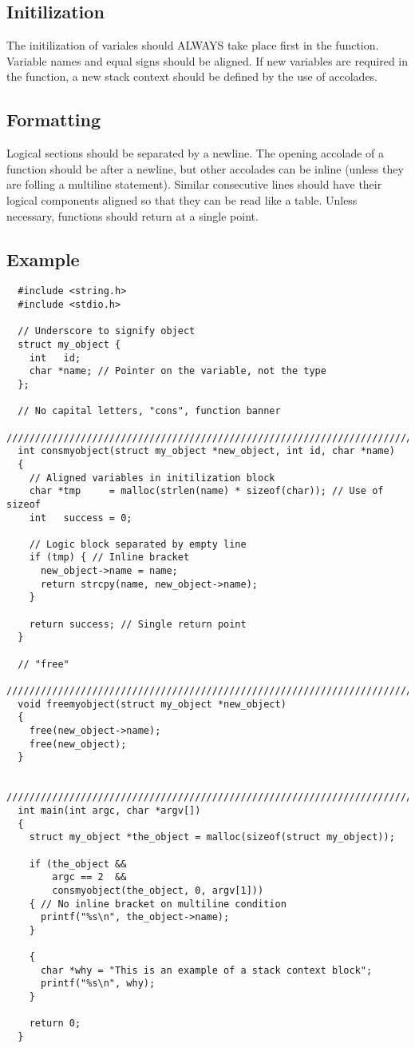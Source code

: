 \documentclass{article}
\begin{document}
\subsection{Initilization}
The initilization of variales should ALWAYS take place first in the function. Variable names and equal signs should be aligned. If new variables are required in the function, a new stack context should be defined by the use of accolades.

\subsection{Formatting}
Logical sections should be separated by a newline. The opening accolade of a function should be after a newline, but other accolades can be inline (unless they are folling a multiline statement). Similar consecutive lines should have their logical components aligned so that they can be read like a table. Unless necessary, functions should return at a single point.

\pagebreak

\subsection{Example}

\begin{lstlisting}
  #include <string.h>
  #include <stdio.h>

  // Underscore to signify object
  struct my_object {
    int   id;
    char *name; // Pointer on the variable, not the type
  };

  // No capital letters, "cons", function banner
  ////////////////////////////////////////////////////////////////////////////////
  int consmyobject(struct my_object *new_object, int id, char *name)
  {
    // Aligned variables in initilization block
    char *tmp     = malloc(strlen(name) * sizeof(char)); // Use of sizeof
    int   success = 0;

    // Logic block separated by empty line
    if (tmp) { // Inline bracket
      new_object->name = name;
      return strcpy(name, new_object->name);
    }

    return success; // Single return point
  }

  // "free"
  ////////////////////////////////////////////////////////////////////////////////
  void freemyobject(struct my_object *new_object)
  {
    free(new_object->name);
    free(new_object);
  }

  ////////////////////////////////////////////////////////////////////////////////
  int main(int argc, char *argv[])
  {
    struct my_object *the_object = malloc(sizeof(struct my_object));

    if (the_object && 
        argc == 2  && 
        consmyobject(the_object, 0, argv[1]))
    { // No inline bracket on multiline condition
      printf("%s\n", the_object->name);
    }

    {
      char *why = "This is an example of a stack context block";
      printf("%s\n", why);
    }

    return 0;
  }

\end{lstlisting}
\end{document}
